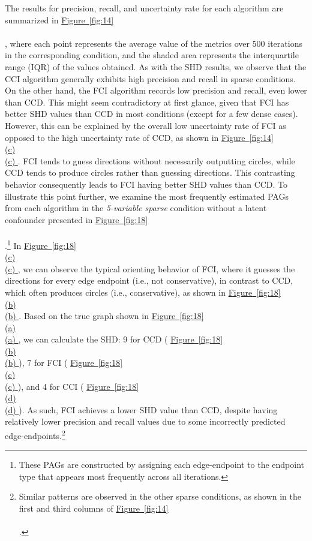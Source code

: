 \documentclass[twoside, 11pt]{article}
\newcommand*{\figref}[2][]{%
  \hyperref[{fig:#2}]{%
    Figure~\ref*{fig:#2}%
    \ifx\\#1\\%
    \else
      #1%
    \fi
  }%
}
\begin{document}
The results for precision, recall, and uncertainty rate for each algorithm are summarized in \figref[]{14}, where each point represents the average value of the metrics over 500 iterations in the corresponding condition, and the shaded area represents the interquartile range (IQR) of the values obtained. As with the SHD results, we observe that the CCI algorithm generally exhibits high precision and recall in sparse conditions. On the other hand, the FCI algorithm records low precision and recall, even lower than CCD. This might seem contradictory at first glance, given that FCI has better SHD values than CCD in most conditions (except for a few dense cases).
However, this can be explained by the overall low uncertainty rate of FCI as opposed to the high uncertainty rate of CCD, as shown in \figref[(c)]{14}. FCI tends to guess directions without necessarily outputting circles, while CCD tends to produce circles rather than guessing directions. This contrasting behavior consequently leads to FCI having better SHD values than CCD. To illustrate this point further, we examine the most frequently estimated PAGs from each algorithm in the \textit{5-variable sparse} condition without a latent confounder presented in \figref[]{18}.\footnote{These PAGs are constructed by assigning each edge-endpoint to the endpoint type that appears most frequently across all iterations.} In \figref[(c)]{18}, we can observe the typical orienting behavior of FCI, where it guesses the directions for every edge endpoint (i.e., not conservative), in contrast to CCD, which often produces circles (i.e., conservative), as shown in \figref[(b)]{18}. Based on the true graph shown in \figref[(a)]{18}, we can calculate the SHD: 9 for CCD (\figref[(b)]{18}), 7 for FCI (\figref[(c)]{18}), and 4 for CCI (\figref[(d)]{18}). 
As such, FCI achieves a lower SHD value than CCD, despite having relatively lower precision and recall values due to some incorrectly predicted edge-endpoints.\footnote{Similar patterns are observed in the other sparse conditions, as shown in the first and third columns of \figref[]{14}.} 
\end{document}
